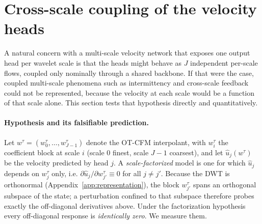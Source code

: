 \section{Cross-scale coupling of the velocity heads}
\label{app:cross-scale}

A natural concern with a multi-scale velocity network that exposes one output
head per wavelet scale is that the heads might behave as $J$ independent
per-scale flows, coupled only nominally through a shared backbone. If that were
the case, coupled multi-scale phenomena such as intermittency and cross-scale
feedback could not be represented, because the velocity at each scale would be a
function of that scale alone. This section tests that hypothesis directly and
quantitatively.

\paragraph{Hypothesis and its falsifiable prediction.}
Let $w^{\tau}=(w^{\tau}_0,\dots,w^{\tau}_{J-1})$ denote the OT-CFM interpolant,
with $w^{\tau}_i$ the coefficient block at scale $i$ (scale $0$ finest, scale
$J-1$ coarsest), and let $\hat{u}_j(w^{\tau})$ be the velocity predicted by
head $j$. A \emph{scale-factorized} model is one for which
$\hat{u}_j$ depends on $w^{\tau}_j$ only, i.e.
$\partial \hat{u}_j / \partial w^{\tau}_{j'} \equiv 0$ for all $j\neq j'$.
Because the DWT is orthonormal (Appendix~\ref{app:representation}), the block
$w^{\tau}_{j'}$ spans an orthogonal subspace of the state; a perturbation
confined to that subspace therefore probes exactly the off-diagonal
derivatives above. Under the factorization hypothesis every off-diagonal
response is \emph{identically zero}. We measure them.

